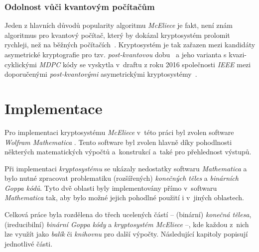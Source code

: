 \documentclass[thesis=M,czech,hidelinks]{FITthesis}[2012/06/26]
\newcommand{\0}{{\textcolor[gray]{0.80}{0}}}
\begin{document}
\clearpage

\subsection{Odolnost vůči kvantovým počítačům}

Jeden z hlavních důvodů popularity algoritmu \emph{McEliece} je fakt, není znám
algoritmus pro kvantový počítač, který by dokázal kryptosystém prolomit
rychleji, než na běžných počítačích~\cite{Dinh}. Kryptosystém je tak zařazen
mezi kandidáty asymetrické kryptografie pro tzv. \emph{post-kvantovou}
dobu~\cite{Post-Quantum_Cryptography} a jeho varianta s kvazi-cyklickými
\emph{MDPC} kódy se vyskytla v~draftu z roku 2016 společnosti \emph{IEEE} mezi
doporučenými \emph{post-kvantovými} asymetrickými kryptosystémy~\cite{Schanck}.





\chapter{Implementace}\label{kap_implementace}

Pro implementaci kryptosystému \emph{McEliece} v~této práci byl zvolen software
\emph{Wolfram Mathematica} \cite{Mathematica}. Tento software byl zvolen hlavně
díky pohodlnosti některých matematických výpočtů a~konstrukcí a~také pro
přehlednost výstupů. %

Při implementaci \emph{kryptosystému} se ukázaly nedostatky softwaru
\emph{Mathematica} a bylo nutné zpracovat problematiku (rozšířených)
\emph{konečných těles} a \emph{binárních Goppa kódů}. Tyto dvě oblasti byly
implementovány přímo v~softwaru \emph{Mathematica} tak, aby bylo možné jejich
pohodlné použití i v~jiných oblastech.

Celková práce byla rozdělena do třech ucelených částí -- (binární) \emph{konečná
tělesa}, (ireducibilní) \emph{binární Goppa kódy} a \emph{kryptosystém McEliece}
--, kde každou z~nich lze využít jako \emph{balík} či \emph{knihovnu} pro další
výpočty. Následující kapitoly popisují jednotlivé části.

\end{document}
